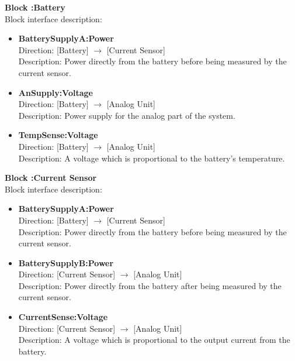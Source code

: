 \textbf{Block :Battery}\\
Block interface description:
\begin{itemize}
	\item \textbf{BatterySupplyA:Power}\\
	Direction: [Battery] $\rightarrow$ [Current Sensor]\\
	Description: Power directly from the battery before being measured by the current sensor.
	\item \textbf{AnSupply:Voltage}\\
	Direction: [Battery] $\rightarrow$ [Analog Unit]\\
	Description: Power supply for the analog part of the system.
	\item \textbf{TempSense:Voltage}\\
	Direction: [Battery] $\rightarrow$ [Analog Unit]\\
	Description: A voltage which is proportional to the battery's temperature.
\end{itemize}

\textbf{Block :Current Sensor}\\
Block interface description:
\begin{itemize}
	\item \textbf{BatterySupplyA:Power}\\
	Direction: [Battery] $\rightarrow$ [Current Sensor]\\
	Description: Power directly from the battery before being measured by the current sensor.
	\item \textbf{BatterySupplyB:Power}\\
	Direction: [Current Sensor] $\rightarrow$ [Analog Unit]\\
	Description: Power directly from the battery after being measured by the current sensor.
	\item \textbf{CurrentSense:Voltage}\\
	Direction: [Current Sensor] $\rightarrow$ [Analog Unit]\\
	Description: A voltage which is proportional to the output current from the battery.
\end{itemize}

